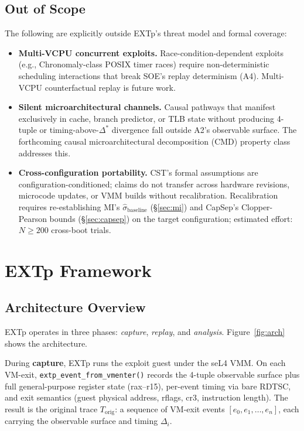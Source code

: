 \documentclass[conference]{IEEEtran}
\newcommand{\Korig}{T_\text{orig}}
\newcommand{\sigbase}{\hat{\sigma}_\text{baseline}}
\newcommand{\Dstar}{\Delta^{*}}
\begin{document}
\subsection*{Out of Scope}

The following are explicitly outside EXTp's threat model and formal
coverage:
\begin{itemize}
\item \textbf{Multi-VCPU concurrent exploits.} Race-condition-dependent
  exploits (e.g., Chronomaly-class POSIX timer races) require
  non-deterministic scheduling interactions that break SOE's replay
  determinism (A4). Multi-VCPU counterfactual replay is future work.
\item \textbf{Silent microarchitectural channels.} Causal pathways
  that manifest exclusively in cache, branch predictor, or TLB state
  without producing 4-tuple or timing-above-$\Dstar$ divergence fall
  outside A2's observable surface. The forthcoming causal
  microarchitectural decomposition (CMD) property class addresses
  this.
\item \textbf{Cross-configuration portability.} CST's formal
  assumptions are configuration-conditioned; claims do not transfer
  across hardware revisions, microcode updates, or VMM builds without
  recalibration. Recalibration requires re-establishing MI's
  $\sigbase$ (\S\ref{sec:mi}) and CapSep's Clopper-Pearson bounds
  (\S\ref{sec:capsep}) on the target configuration; estimated effort:
  $N \geq 200$ cross-boot trials.
\end{itemize}

\section{EXTp Framework}\label{sec:framework}

\subsection{Architecture Overview}

EXTp operates in three phases: \emph{capture}, \emph{replay}, and
\emph{analysis}. Figure~\ref{fig:arch} shows the architecture.

During \textbf{capture}, EXTp runs the exploit guest under the seL4
VMM. On each VM-exit, \texttt{extp\_event\_from\_vmenter()} records
the 4-tuple observable surface plus full general-purpose register
state (rax--r15), per-event timing via bare RDTSC, and exit semantics
(guest physical address, rflags, cr3, instruction length). The
result is the original trace $\Korig$: a sequence of VM-exit events
$[e_0, e_1, \ldots, e_n]$, each carrying the observable surface and
timing $\Delta_i$.
\end{document}
